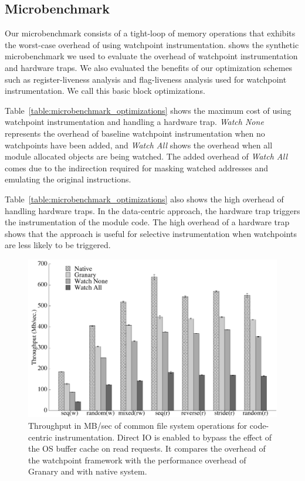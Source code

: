 \subsection{Microbenchmark}
Our microbenchmark consists of a tight-loop of memory operations that exhibits the worst-case overhead of using watchpoint instrumentation.  shows the synthetic microbenchmark we used to evaluate the overhead of watchpoint instrumentation and hardware traps. We also evaluated the benefits of our optimization schemes such as register-liveness analysis and flag-liveness analysis used for watchpoint instrumentation. We call this basic block optimizations. 

Table~\ref{table:microbenchmark_optimizations} shows the maximum cost of using watchpoint instrumentation and handling a hardware trap. \emph{Watch None} represents the overhead of baseline watchpoint instrumentation when no watchpoints have been added, and \emph{Watch All} shows the overhead when all module allocated objects are being watched. The added overhead of \emph{Watch All} comes due to the indirection required for masking watched addresses and emulating the original instructions. 


Table~\ref{table:microbenchmark_optimizations} also shows the high overhead of handling hardware traps. In the data-centric approach, the hardware trap triggers the instrumentation of the module code. The high overhead of a hardware trap shows that the approach is useful for selective instrumentation when watchpoints are less likely to be triggered. 







\begin{figure}[t]
\begin{center}
\includegraphics[width=4.5in]{thesis_code_driven.pdf}
\end{center}
\caption[Performance impact of code centric instrumentation.]{\label{fig:watchpoint_performance_code_driven}Throughput in MB/sec of common file system operations for code-centric instrumentation. Direct IO is enabled to bypass the effect of the OS buffer cache on read requests. It compares the overhead of the watchpoint framework with the performance overhead of Granary and with native system.}
\end{figure}

